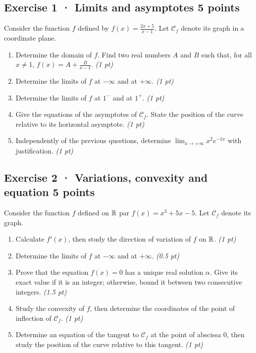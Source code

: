 \subsection*{Exercise 1 · Limits and asymptotes \hfill 5 points}Consider the function $f$ defined by $f(x)=\frac{2x+5}{x-1}$. Let $\mathcal C_f$ denote its graph in a coordinate plane.

\begin{enumerate}

\item Determine the domain of $f$. Find two real numbers $A$ and $B$ such that, for all $x\ne1$, $f(x)=A+\frac B{x-1}$. \hfill\textit{(1 pt)}

\item Determine the limits of $f$ at $-\infty$ and at $+\infty$. \hfill\textit{(1 pt)}

\item Determine the limits of $f$ at $1^-$ and at $1^+$. \hfill\textit{(1 pt)}

\item Give the equations of the asymptotes of $\mathcal C_f$. State the position of the curve relative to its horizontal asymptote. \hfill\textit{(1 pt)}

\item Independently of the previous questions, determine $\displaystyle\lim_{x\to+\infty}x^{2}e^{-1x}$ with justification. \hfill\textit{(1 pt)}

\end{enumerate}

\subsection*{Exercise 2 · Variations, convexity and equation \hfill 5 points}Consider the function $f$ defined on $\mathbb R$ par $f(x)=x^3+5x-5$. Let $\mathcal C_f$ denote its graph.

\begin{enumerate}

\item Calculate $f'(x)$, then study the direction of variation of $f$ on $\mathbb R$. \hfill\textit{(1 pt)}

\item Determine the limits of $f$ at $-\infty$ and at $+\infty$. \hfill\textit{(0.5 pt)}

\item Prove that the equation $f(x)=0$ has a unique real solution $\alpha$. Give its exact value if it is an integer; otherwise, bound it between two consecutive integers. \hfill\textit{(1.5 pt)}

\item Study the convexity of $f$, then determine the coordinates of the point of inflection of $\mathcal C_f$. \hfill\textit{(1 pt)}

\item Determine an equation of the tangent to $\mathcal C_f$ at the point of abscissa $0$, then study the position of the curve relative to this tangent. \hfill\textit{(1 pt)}

\end{enumerate}

